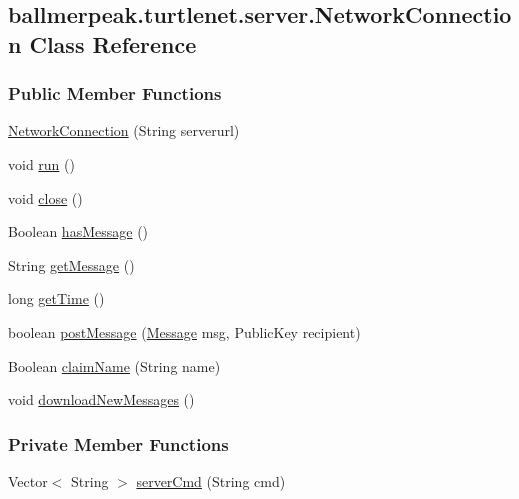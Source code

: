 \hypertarget{classballmerpeak_1_1turtlenet_1_1server_1_1NetworkConnection}{\subsection{ballmerpeak.\-turtlenet.\-server.\-Network\-Connection Class Reference}
\label{classballmerpeak_1_1turtlenet_1_1server_1_1NetworkConnection}
}
\subsubsection*{Public Member Functions}
\begin{DoxyCompactItemize}
\item 
\hyperlink{classballmerpeak_1_1turtlenet_1_1server_1_1NetworkConnection_ae7c0317cc0fa85bc885799436affb5e6}{Network\-Connection} (String serverurl)
\item 
void \hyperlink{classballmerpeak_1_1turtlenet_1_1server_1_1NetworkConnection_a44b870f7d418ce3ab69587e94ce32a74}{run} ()
\item 
void \hyperlink{classballmerpeak_1_1turtlenet_1_1server_1_1NetworkConnection_a1bb312cc4af1b95710ecd9b65c5215ce}{close} ()
\item 
Boolean \hyperlink{classballmerpeak_1_1turtlenet_1_1server_1_1NetworkConnection_aadf8e9595cea4dadbb82355e58ba72ec}{has\-Message} ()
\item 
String \hyperlink{classballmerpeak_1_1turtlenet_1_1server_1_1NetworkConnection_a5b9adc8fa4dee623cc1d1c33ccaa7846}{get\-Message} ()
\item 
long \hyperlink{classballmerpeak_1_1turtlenet_1_1server_1_1NetworkConnection_adc4c65f1c818d16a6abd8ace93bf0047}{get\-Time} ()
\item 
boolean \hyperlink{classballmerpeak_1_1turtlenet_1_1server_1_1NetworkConnection_adde42c7caa6295080ba05a66f4bb9ad3}{post\-Message} (\hyperlink{classballmerpeak_1_1turtlenet_1_1shared_1_1Message}{Message} msg, Public\-Key recipient)
\item 
Boolean \hyperlink{classballmerpeak_1_1turtlenet_1_1server_1_1NetworkConnection_a023c16ede7a0c0175e31a937823fbc8f}{claim\-Name} (String name)
\item 
void \hyperlink{classballmerpeak_1_1turtlenet_1_1server_1_1NetworkConnection_aa13cfceaafe089d920b79b877a5b810c}{download\-New\-Messages} ()
\end{DoxyCompactItemize}
\subsubsection*{Private Member Functions}
\begin{DoxyCompactItemize}
\item 
Vector$<$ String $>$ \hyperlink{classballmerpeak_1_1turtlenet_1_1server_1_1NetworkConnection_a117a5b525dfb1a2e03ed10ce9adaed77}{server\-Cmd} (String cmd)
\end{DoxyCompactItemize}
